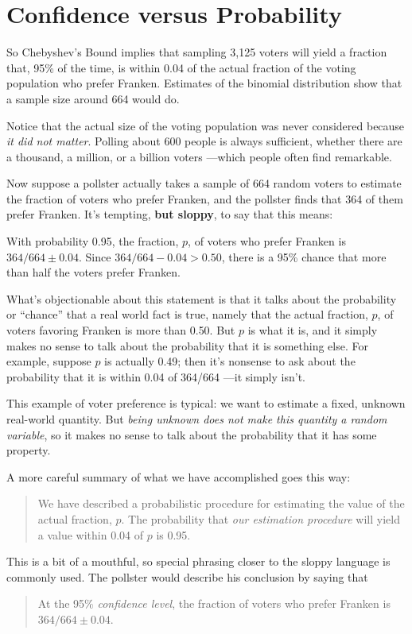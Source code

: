 \section{Confidence versus Probability}


So Chebyshev's Bound implies that sampling 3,125 voters will yield a
fraction that, 95\% of the time, is within 0.04 of the actual fraction of
the voting population who prefer Franken.   Estimates of the binomial
distribution show that a sample size around 664 would do.

Notice that the actual size of the voting population was never considered
because \emph{it did not matter}.  Polling about 600 people is always
sufficient, whether there are a thousand, a million, or a billion voters
---which people often find remarkable.

Now suppose a pollster actually takes a sample of 664 random voters to
estimate the fraction of voters who prefer Franken, and the pollster finds
that 364 of them prefer Franken.  It's tempting, \textbf{but sloppy}, to
say that this means:
\begin{falseclm*}
With probability 0.95, the fraction, $p$, of voters who prefer
Franken is $364/664 \pm 0.04$.  Since $364/664 -0.04 >0.50$, there is a 95\%
chance that more than half the voters prefer Franken.
\end{falseclm*}
What's objectionable about this statement is that it talks about the
probability or ``chance'' that a real world fact is true, namely that the
actual fraction, $p$, of voters favoring Franken is more than 0.50.  But $p$
is what it is, and it simply makes no sense to talk about the probability
that it is something else.  For example, suppose $p$ is actually 0.49;
then it's nonsense to ask about the probability that it is within 0.04 of
364/664 ---it simply isn't.

This example of voter preference is typical: we want to estimate a fixed,
unknown real-world quantity.  But \emph{being unknown does not make this
  quantity a random variable}, so it makes no sense to talk about the
probability that it has some property.

A more careful summary of what we have accomplished goes this way:
\begin{quote}
We have described a probabilistic procedure for estimating the value of
the actual fraction, $p$.  The probability that \emph{our estimation
procedure} will yield a value within 0.04 of $p$ is 0.95.
\end{quote}
This is a bit of a mouthful, so special phrasing closer to the sloppy
language is commonly used.  The pollster would describe his conclusion by
saying that
\begin{quote}
At the 95\% \emph{confidence level}, the fraction of voters
who prefer Franken is $364/664 \pm 0.04$.
\end{quote}

